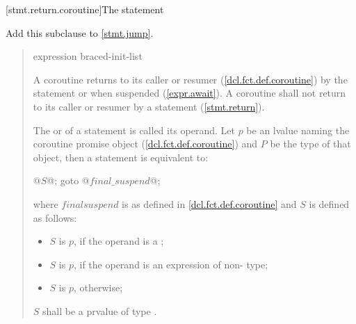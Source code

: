 [stmt.return.coroutine]{The  statement}%

Add this subclause to \ref{stmt.jump}.

\begin{quote}

\begin{bnf}
	\br
	 expression\opt \terminal{;}\br
	 braced-init-list\terminal{;}
\end{bnf}

\pnum
A coroutine returns to its caller or resumer (\ref{dcl.fct.def.coroutine}) by the  statement
or when suspended (\ref{expr.await}). A coroutine shall not return to its caller or resumer by a  statement (\ref{stmt.return}).

\pnum
The  or  of a  statement is called its operand.
Let $p$ be an lvalue naming the coroutine promise object (\ref{dcl.fct.def.coroutine}) and $P$ be the type of that object, 
then a  statement is equivalent to:

 

\begin{codeblock}
  { @$S$@; goto @$final{\_}suspend$@; }
\end{codeblock}

where $final$\tcode{\_}$suspend$ is as defined in \ref{dcl.fct.def.coroutine} and $S$ is defined as follows:

\begin{itemize}
  \item $S$ is  $p$\tcode{)}, if the operand is a ;
  \item $S$ is  $p$\tcode{)}, if the operand is an expression of non- type;
  \item $S$ is \tcode{\{}{ }\opt \tcode{;} $p$\tcode{;{ }\}}, otherwise;
\end{itemize}
$S$ shall be a prvalue of type .


\end{quote}
